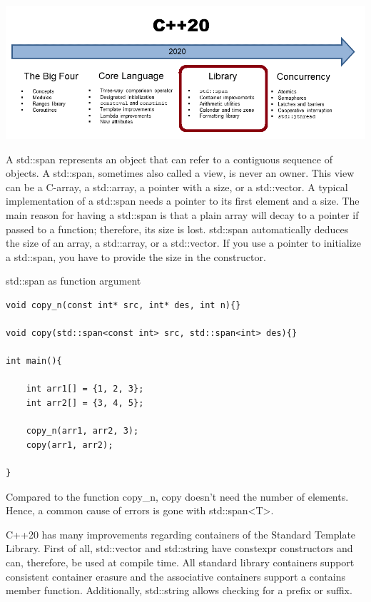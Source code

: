 

\begin{center}
\includegraphics[width=1.0\textwidth]{content/2/chapter3/images/6.png}\\
\end{center}


A std::span represents an object that can refer to a contiguous sequence of objects. A std::span, sometimes also called a view, is never an owner. This view can be a C-array, a std::array, a pointer with a size, or a std::vector. A typical implementation of a std::span needs a pointer to its first element and a size. The main reason for having a std::span is that a plain array will decay to a pointer if passed to a function; therefore, its size is lost. std::span automatically deduces the size of an array, a std::array, or a std::vector. If you use a pointer to initialize a std::span, you have to provide the size in the constructor.

\noindent
std::span as function argument
\begin{lstlisting}[style=styleCXX]
void copy_n(const int* src, int* des, int n){}

void copy(std::span<const int> src, std::span<int> des){}

int main(){
	
	int arr1[] = {1, 2, 3};
	int arr2[] = {3, 4, 5};
	
	copy_n(arr1, arr2, 3);
	copy(arr1, arr2);
	
}
\end{lstlisting}

Compared to the function copy\_n, copy doesn’t need the number of elements. Hence, a common cause of errors is gone with std::span<T>.


C++20 has many improvements regarding containers of the Standard Template Library. First of all, std::vector and std::string have constexpr constructors and can, therefore, be used at compile time. All standard library containers support consistent container erasure and the associative containers support a contains member function. Additionally, std::string allows checking for a prefix or suffix.


